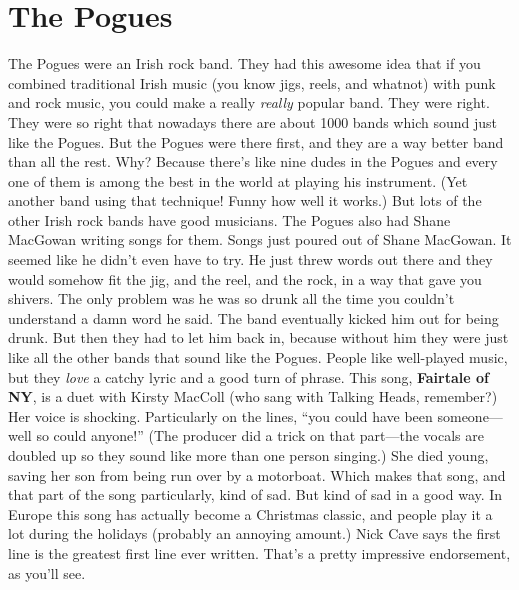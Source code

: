 \documentclass[letterpaper,single]{article}
\begin{document}
\section{The Pogues}
The Pogues were an Irish rock band. 
They had this awesome idea that if you combined traditional Irish music (you know jigs, reels, and whatnot) with punk and rock music, you could make a really \emph{really} popular band. 
They were right. 
They were so right that nowadays there are about 1000 bands which sound just like the Pogues. 
But the Pogues were there first, and they are a way better band than all the rest. 
Why? 
Because there's like nine dudes in the Pogues and every one of them is among the best in the world at playing his instrument. (Yet another band using that technique! Funny how well it works.) 
But lots of the other Irish rock bands have good musicians. 
The Pogues also had Shane MacGowan writing songs for them. 
Songs just poured out of Shane MacGowan. 
It seemed like he didn't even have to try. 
He just threw words out there and they would somehow fit the jig, and the reel, and the rock, in a way that gave you shivers. 
The only problem was he was so drunk all the time you couldn't understand a damn word he said. 
The band eventually kicked him out for being drunk. 
But then they had to let him back in, because without him they were just like all the other bands that sound like the Pogues.
People like well-played music, but they \emph{love} a catchy lyric and a good turn of phrase. 
This song, \textbf{Fairtale of NY}, is a duet with Kirsty MacColl (who sang with Talking Heads, remember?) 
Her voice is shocking. 
Particularly on the lines, ``you could have been someone---well so could anyone!''
(The producer did a trick on that part---the vocals are doubled up so they sound like more than one person singing.) 
She died young, saving her son from being run over by a motorboat. Which makes that song, and that part of the song particularly, kind of sad. But kind of sad in a good way.
In Europe this song has actually become a Christmas classic, and people play it a lot during the holidays (probably an annoying amount.) 
Nick Cave says the first line is the greatest first line ever written.
That's a pretty impressive endorsement, as you'll see.
\end{document}
